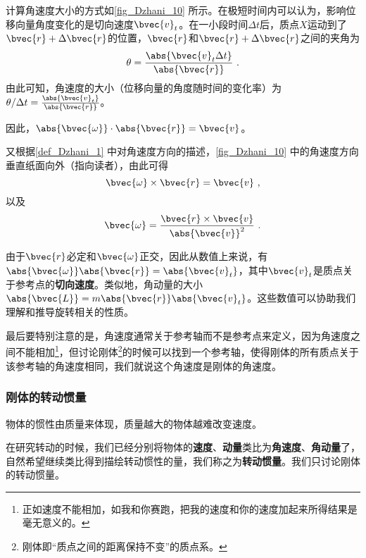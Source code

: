 计算角速度大小的方式如\autoref{fig_Dzhani_10} 所示。在极短时间内可以认为，影响位移向量角度变化的是切向速度$\bvec{v}_t$。在一小段时间$\Delta t$后，质点$X$运动到了$\bvec{r}+\Delta \bvec{r}$的位置，$\bvec{r}$和$\bvec{r}+\Delta \bvec{r}$之间的夹角为
\begin{equation}
\theta = \frac{\abs{\bvec{v}_t \Delta t}}{\abs{\bvec{r}}}~. 
\end{equation}
由此可知，角速度的大小（位移向量的角度随时间的变化率）为$\theta/\Delta t = \frac{\abs{\bvec{v}_t}}{\abs{\bvec{r}}}$。

因此，$\abs{\bvec{\omega}}\cdot\abs{\bvec{r}}=\bvec{v}$。

又根据\autoref{def_Dzhani_1} 中对角速度方向的描述，\autoref{fig_Dzhani_10} 中的角速度方向垂直纸面向外（指向读者），由此可得
\begin{equation}
\bvec{\omega}\times\bvec{r} = \bvec{v}~, 
\end{equation}
以及
\begin{equation}
\bvec{\omega} = \frac{\bvec{r}\times\bvec{v}}{\abs{\bvec{v}}^2}~. 
\end{equation}

由于$\bvec{r}$必定和$\bvec{\omega}$正交，因此从数值上来说，有$\abs{\bvec{\omega}}\abs{\bvec{r}}=\abs{\bvec{v}_t}$，其中$\bvec{v}_t$是质点关于参考点的\textbf{切向速度}。类似地，角动量的大小$\abs{\bvec{L}}=m\abs{\bvec{r}}\abs{\bvec{v}_t}$。这些数值可以协助我们理解和推导旋转相关的性质。



最后要特别注意的是，角速度通常关于参考轴而不是参考点来定义，因为角速度之间不能相加\footnote{正如速度不能相加，如我和你赛跑，把我的速度和你的速度加起来所得结果是毫无意义的。}，但讨论刚体\footnote{刚体即“质点之间的距离保持不变”的质点系。}的时候可以找到一个参考轴，使得刚体的所有质点关于该参考轴的角速度相同，我们就说这个角速度是刚体的角速度。



\subsubsection{刚体的转动惯量}



物体的惯性由质量来体现，质量越大的物体越难改变速度。


在研究转动的时候，我们已经分别将物体的\textbf{速度}、\textbf{动量}类比为\textbf{角速度}、\textbf{角动量}了，自然希望继续类比得到描绘转动惯性的量，我们称之为\textbf{转动惯量}。我们只讨论刚体的转动惯量。



